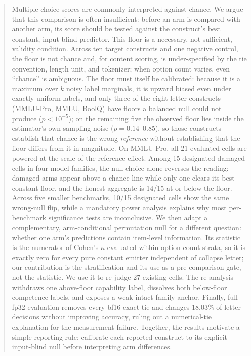\begin{abstract}
Multiple-choice scores are commonly interpreted against chance. We argue that this comparison is often insufficient: before an arm is compared with another arm, its score should be tested against the construct's best constant, input-blind predictor. This floor is a necessary, not sufficient, validity condition. Across ten target constructs and one negative control, the floor is not chance and, for content scoring, is under-specified by the tie convention, length unit, and tokenizer; when option count varies, even ``chance'' is ambiguous. The floor must itself be calibrated: because it is a maximum over $k$ noisy label marginals, it is upward biased even under exactly uniform labels, and only three of the eight letter constructs (MMLU-Pro, MMLU, BoolQ) have floors a balanced null could not produce ($p<10^{-5}$); on the remaining five the observed floor lies inside the estimator's own sampling noise ($p=0.14$--$0.85$), so those constructs establish that chance is the wrong \emph{reference} without establishing that the floor differs from it in magnitude. On MMLU-Pro, all 21 evaluated cells are powered at the scale of the reference effect. Among 15 designated damaged cells in four model families, the null choice alone reverses the reading: damaged arms appear above a chance line while only one clears its best-constant floor, and the honest aggregate is 14/15 at or below the floor. Across five smaller benchmarks, 10/15 designated cells show the same wrong-null flip, while a mandatory power analysis explains why most per-benchmark significance tests are inconclusive. We then adapt a complementary, arm-conditional permutation null for a different question: whether one arm's predictions contain item-level information. Its statistic is the numerator of Cohen's $\kappa$ evaluated within option-count strata, so it is exactly zero for every pure constant emitter independent of collapse letter; our contribution is the stratification and its use as a pre-comparison gate, not the statistic. We use it to re-judge 27 existing cells. The re-analysis withdraws one above-floor capability label, dissolves both below-floor competence labels, and exposes a weak intact-family anchor. Finally, full-fp32 evaluation removes every bf16 exact tie and changes 18.03\% of letter decisions without improving accuracy, ruling out a numerical-tie explanation for the measurement failure. Together, the results motivate a simple reporting rule: calibrate each reported construct to its explicit input-blind null before interpreting arm differences.
\end{abstract}
